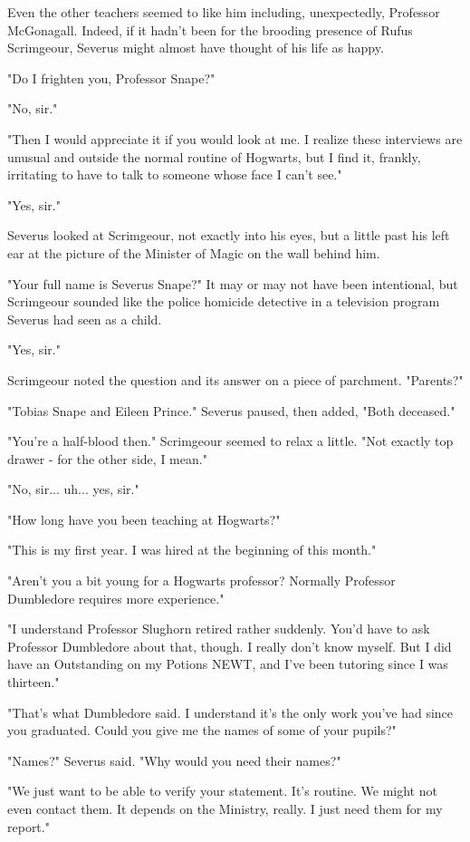 Even the other teachers seemed to like him including, unexpectedly, Professor McGonagall. Indeed, if it hadn't been for the brooding presence of Rufus Scrimgeour, Severus might almost have thought of his life as happy.

"Do I frighten you, Professor Snape?"

"No, sir."

"Then I would appreciate it if you would look at me. I realize these interviews are unusual and outside the normal routine of Hogwarts, but I find it, frankly, irritating to have to talk to someone whose face I can't see."

"Yes, sir."

Severus looked at Scrimgeour, not exactly into his eyes, but a little past his left ear at the picture of the Minister of Magic on the wall behind him.

"Your full name is Severus Snape?" It may or may not have been intentional, but Scrimgeour sounded like the police homicide detective in a television program Severus had seen as a child.

"Yes, sir."

Scrimgeour noted the question and its answer on a piece of parchment. "Parents?"

"Tobias Snape and Eileen Prince." Severus paused, then added, "Both deceased."

"You're a half-blood then." Scrimgeour seemed to relax a little. "Not exactly top drawer - for the other side, I mean."

"No, sir... uh... yes, sir."

"How long have you been teaching at Hogwarts?"

"This is my first year. I was hired at the beginning of this month."

"Aren't you a bit young for a Hogwarts professor? Normally Professor Dumbledore requires more experience."

"I understand Professor Slughorn retired rather suddenly. You'd have to ask Professor Dumbledore about that, though. I really don't know myself. But I did have an Outstanding on my Potions NEWT, and I've been tutoring since I was thirteen."

"That's what Dumbledore said. I understand it's the only work you've had since you graduated. Could you give me the names of some of your pupils?"

"Names?" Severus said. "Why would you need their names?"

"We just want to be able to verify your statement. It's routine. We might not even contact them. It depends on the Ministry, really. I just need them for my report."

